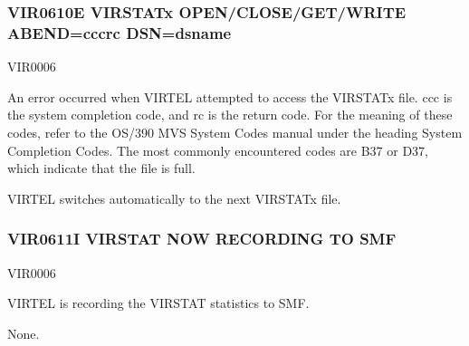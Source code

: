 \documentclass[letterpaper,10pt,english]{sphinxmanual}
\begin{document}
\subsubsection{VIR0610E VIRSTATx OPEN/CLOSE/GET/WRITE ABEND=ccc\sphinxhyphen{}rc DSN=dsname}
\label{\detokenize{messages:vir0610e-virstatx-open-close-get-write-abend-ccc-rc-dsn-dsname}}\begin{description}
\sphinxAtStartPar
VIR0006

\sphinxAtStartPar
An error occurred when VIRTEL attempted to access the VIRSTATx file. ccc is the system completion code, and rc is the return code. For the meaning of these codes, refer to the OS/390 MVS System Codes manual under the heading System Completion Codes. The most commonly encountered codes are B37 or D37, which indicate that the file is full.

\sphinxAtStartPar
VIRTEL switches automatically to the next VIRSTATx file.

\end{description}


\subsubsection{VIR0611I VIRSTAT NOW RECORDING TO SMF}
\label{\detokenize{messages:vir0611i-virstat-now-recording-to-smf}}\begin{description}
\sphinxAtStartPar
VIR0006

\sphinxAtStartPar
VIRTEL is recording the VIRSTAT statistics to SMF.

\sphinxAtStartPar
None.

\end{description}
\end{document}
